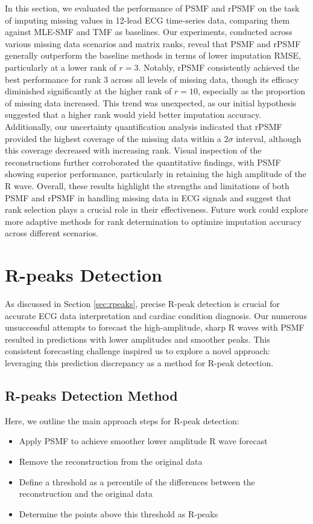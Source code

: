 \documentclass{mldsmsc}
\begin{document}
\noindent In this section, we evaluated the performance of PSMF and rPSMF on the task of imputing missing values in 12-lead ECG time-series data, comparing them against MLE-SMF and TMF as baselines. Our experiments, conducted across various missing data scenarios and matrix ranks, reveal that PSMF and rPSMF generally outperform the baseline methods in terms of lower imputation RMSE, particularly at a lower rank of $r = 3$. Notably, rPSMF consistently achieved the best performance for rank 3 across all levels of missing data, though its efficacy diminished significantly at the higher rank of $r = 10$, especially as the proportion of missing data increased. This trend was unexpected, as our initial hypothesis suggested that a higher rank would yield better imputation accuracy. Additionally, our uncertainty quantification analysis indicated that rPSMF provided the highest coverage of the missing data within a $2\sigma$ interval, although this coverage decreased with increasing rank. Visual inspection of the reconstructions further corroborated the quantitative findings, with PSMF showing superior performance, particularly in retaining the high amplitude of the R wave. Overall, these results highlight the strengths and limitations of both PSMF and rPSMF in handling missing data in ECG signals and suggest that rank selection plays a crucial role in their effectiveness. Future work could explore more adaptive methods for rank determination to optimize imputation accuracy across different scenarios.

\section{R-peaks Detection}

As discussed in Section \ref{sec:rpeaks}, precise R-peak detection is crucial for accurate ECG data interpretation and cardiac condition diagnosis. Our numerous unsuccessful attempts to forecast the high-amplitude, sharp R waves with PSMF resulted in predictions with lower amplitudes and smoother peaks. This consistent forecasting challenge inspired us to explore a novel approach: leveraging this prediction discrepancy as a method for R-peak detection.

\subsection{R-peaks Detection Method}

\noindent Here, we outline the main approach steps for R-peak detection:
\begin{itemize}
    \item Apply PSMF to achieve smoother lower amplitude R wave forecast
    \item Remove the reconstruction from the original data
    \item Define a threshold as a percentile of the differences between the reconstruction and the original data
    \item Determine the points above this threshold as R-peaks
\end{itemize}
\end{document}
